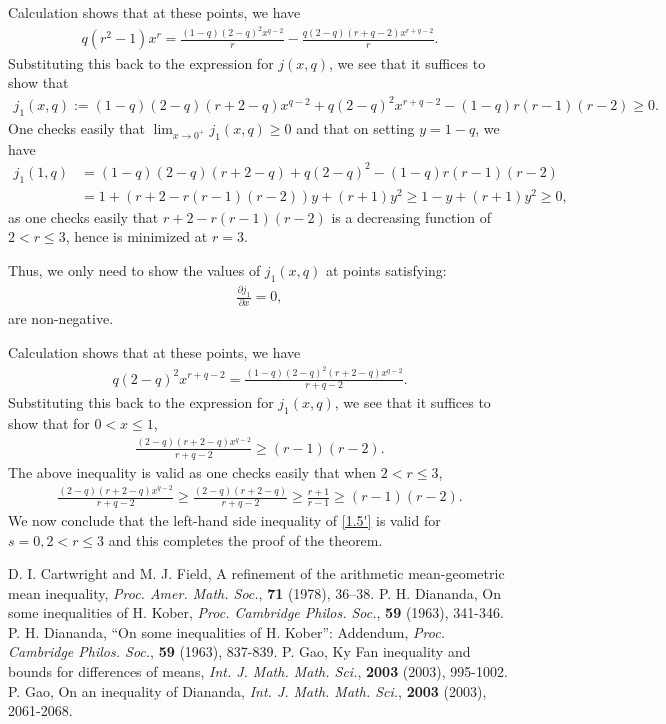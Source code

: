 \documentclass[11pt]{amsart}
\numberwithin{equation}{section}
\theoremstyle{definition}
\theoremstyle{remark}
\begin{document}
  Calculation shows that at these points, we have
\begin{align*}
   q(r^2-1)x^r=\frac {(1-q)(2-q)^2x^{q-2}}{r}-\frac {q(2-q)(r+q-2)x^{r+q-2}}{r} .
\end{align*}
   Substituting this back to the expression for $j(x,q)$, we see that it suffices to show that
\begin{align*}
  j_1(x,q):=(1-q)(2-q)(r+2-q)x^{q-2}+q(2-q)^2x^{r+q-2} -(1-q)r(r-1)(r-2) \geq 0.
\end{align*}
   One checks easily that $\lim_{x \rightarrow 0^+}j_1(x,q) \geq 0$ and that on setting $y=1-q$, we have
\begin{align*}
  j_1(1,q)&=(1-q)(2-q)(r+2-q)+q(2-q)^2-(1-q)r(r-1)(r-2) \\
          &=1+(r+2-r(r-1)(r-2))y+(r+1)y^2 \geq 1-y+(r+1)y^2 \geq 0,
\end{align*}
   as one checks easily that $r+2-r(r-1)(r-2)$ is a decreasing function of $2<r \leq 3$, hence is minimized at $r=3$.

    Thus, we only need to show the values of $j_1(x,q)$ at points satisfying:
\begin{align*}
   \frac {\partial j_1}{\partial x}=0,
\end{align*}
   are non-negative.

   Calculation shows that at these points, we have
\begin{align*}
   q(2-q)^2x^{r+q-2}=\frac {(1-q)(2-q)^2(r+2-q)x^{q-2}}{r+q-2}.
\end{align*}
   Substituting this back to the expression for $j_1(x,q)$, we see that it suffices to show that for $0<x \leq 1$,
\begin{align*}
  \frac {(2-q)(r+2-q)x^{q-2}}{r+q-2} \geq (r-1)(r-2).
\end{align*}
   The above inequality is valid as one checks easily that when $2<r \leq 3$,
\begin{align*}
  \frac {(2-q)(r+2-q)x^{q-2}}{r+q-2} \geq \frac {(2-q)(r+2-q)}{r+q-2} \geq  \frac {r+1}{r-1}\geq (r-1)(r-2).
\end{align*}
  We now conclude that the left-hand side inequality of \eqref{1.5'} is valid for $s=0, 2<r \leq 3$ and this completes the proof of the theorem.

\begin{thebibliography}{99}
 D. I. Cartwright and  M. J. Field, A refinement
of the arithmetic mean-geometric mean inequality, {\em Proc. Amer.
Math. Soc.}, {\bf 71} (1978), 36--38.
 P. H. Diananda, On some inequalities of H.
Kober, {\em Proc. Cambridge Philos. Soc.}, {\bf 59} (1963), 341-346.
 P. H. Diananda, ``On some inequalities of H. Kober'':
Addendum, {\em Proc. Cambridge Philos. Soc.}, {\bf 59} (1963),
837-839.
 P. Gao, Ky Fan inequality and bounds for differences of means, {\em Int. J.
Math. Math. Sci.}, {\bf 2003} (2003), 995-1002.
 P. Gao, On an inequality of Diananda, {\em Int. J.
Math. Math. Sci.}, {\bf 2003} (2003), 2061-2068.

\end{thebibliography}
\end{document}

